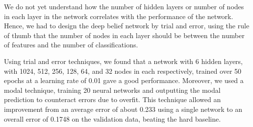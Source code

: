 \documentclass[a4paper, 11pt]{article}
\begin{document}
We do not yet understand how the number of hidden layers or number of nodes in each layer in the network correlates with the performance of the network. Hence, we had to design the deep belief network by trial and error, using the rule of thumb that the number of nodes in each layer should be between the number of features and the number of classifications.

Using trial and error techniques, we found that a network with 6 hidden layers, with 1024, 512, 256, 128, 64, and 32 nodes in each respectively, trained over 50 epochs at a learning rate of 0.01 gave a good performance. Moreover, we used a modal technique, training 20 neural networks and outputting the modal prediction to counteract errors due to overfit. This technique allowed an improvement from an average error of about 0.233 using a single network to an overall error of 0.1748 on the validation data, beating the hard baseline.
\end{document}
